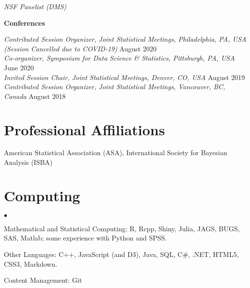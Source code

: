 \documentclass[margin,line]{res}
\newenvironment{list2}{
  \begin{list}{$\bullet$}{%
      \setlength{\itemsep}{0in}
      \setlength{\parsep}{0in} \setlength{\parskip}{0in}
      \setlength{\topsep}{0in} \setlength{\partopsep}{0in}
      \setlength{\leftmargin}{0.2in}}}{\end{list}}
\begin{document}
\begin{resume}
\vspace{-.3cm}
{\em NSF Panelist (DMS)}


{\bf Conferences}

\vspace{-.3cm}
{\em Contributed Session Organizer, Joint Statistical Meetings, Philadelphia, PA, USA (Session Cancelled due to COVID-19)} \hfill {August 2020} \\
{\em Co-organizer, Symposium for Data Science \& Statistics, Pittsburgh, PA, USA} \hfill {June 2020} \\
{\em Invited Session Chair, Joint Statistical Meetings, Denver, CO, USA} \hfill {August 2019} \\
{\em Contributed Session Organizer, Joint Statistical Meetings, Vancouver, BC, Canada} \hfill {August 2018}

\section{\sc Professional Affiliations}
American Statistical Association (ASA), International Society for Bayesian Analysis (ISBA)

\section{\sc Computing}
\begin{list2}
\item Mathematical and Statistical Computing:  R, Rcpp, Shiny, Julia, JAGS, BUGS, SAS, Matlab; some experience  with Python and SPSS.
\item Other Languages: C++, JavaScript (and D3), Java, SQL, C\#, .NET, HTML5, CSS3, Markdown.
\item Content Management: Git
\end{list2}











\end{resume}
\end{document}
